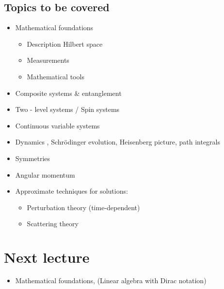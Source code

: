 \documentclass{elsarticle}
\begin{document}
	\subsection*{Topics to be covered}
	\begin{itemize}
		\item Mathematical foundations
		\begin{itemize}
			\item Description Hilbert space
			\item Measurements
			\item Mathematical tools
		\end{itemize}
	\item Composite systems \& entanglement
	\item Two - level systems / Spin systems
	\item Continuous variable systems
	\item Dynamics , Schrödinger evolution, Heisenberg picture, path integrals
	\end{itemize}
	\begin{itemize}
		\item Symmetries
		\item Angular momentum
		\item Approximate techniques for solutions:
			\begin{itemize}
				\item Perturbation theory (time-dependent)
				\item Scattering theory
			\end{itemize}
	\end{itemize}
	\section*{Next lecture}
	\begin{itemize}
		\item Mathematical foundations, (Linear algebra with Dirac notation)
	\end{itemize}
\end{document}
